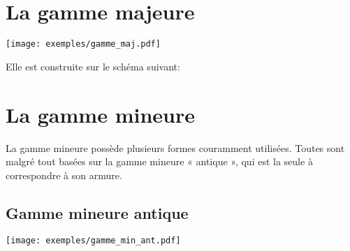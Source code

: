 \documentclass[11pt]{scrreprt}
\begin{document}

\section{La gamme majeure}
\begin{center}
  \texttt{[image: exemples/gamme\_maj.pdf]}
\end{center}
Elle est construite sur le schéma suivant: 
\begin{center}
\end{center}


\section{La gamme mineure}
La gamme mineure possède plusieurs formes couramment utilisées. Toutes sont malgré tout basées sur la gamme mineure « antique », qui est la seule à correspondre à son armure.

\subsection{Gamme mineure antique\label{min_ant}}
\begin{center}
   \texttt{[image: exemples/gamme\_min\_ant.pdf]}
\end{center}
\end{document}
